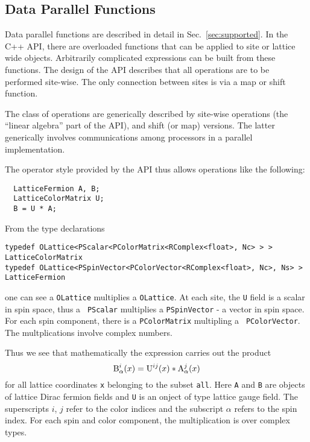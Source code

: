 \documentclass[12pt,letterpaper]{article}
\newcommand{\cpp}{C++}
\begin{document}
\newpage

\subsection{Data Parallel Functions}

Data parallel functions are described in detail in
Sec.~\ref{sec:supported}.  
In the \cpp{} API, there are overloaded functions that can be applied
to site or lattice wide objects. Arbitrarily complicated expressions
can be built from these functions.  The design of the API describes
that all operations are to be performed site-wise. The only connection
between sites is via a map or shift function.

The class of operations are generically described by site-wise
operations (the ``linear algebra'' part of the API), and shift (or
map) versions. The latter generically involves communications among
processors in a parallel implementation.

The operator style provided by the API thus allows operations like
the following:
%
\begin{verbatim}
  LatticeFermion A, B;
  LatticeColorMatrix U;
  B = U * A;
\end{verbatim}
%
From the type declarations
%
\begin{small}
\begin{verbatim}
typedef OLattice<PScalar<PColorMatrix<RComplex<float>, Nc> > > LatticeColorMatrix
typedef OLattice<PSpinVector<PColorVector<RComplex<float>, Nc>, Ns> > LatticeFermion
\end{verbatim}
\end{small}
%
one can see a {\tt OLattice} multiplies a {\tt OLattice}. At each
site, the {\tt U} field is a scalar in spin space, thus a {\tt
PScalar} multiplies a {\tt PSpinVector} - a vector in spin space. For
each spin component, there is a {\tt PColorMatrix} multipling a {\tt
PColorVector}. The multplications involve complex numbers. 

Thus we see that mathematically the expression carries out the product
%
\begin{displaymath}
{\rm B}_\alpha^{i}(x) = {\rm U}^{i j}(x) * {\rm A}_\alpha^{j}(x)
\end{displaymath}
%
for all lattice coordinates {\tt x} belonging to the subset {\tt all}.
Here {\tt A} and {\tt B} are objects of lattice Dirac fermion fields
and {\tt U} is an onject of type lattice gauge field. The superscripts
$i$, $j$ refer to the color indices and the subscript $\alpha$ refers
to the spin index. For each spin and color component, the
multiplication is over complex types.
\end{document}
